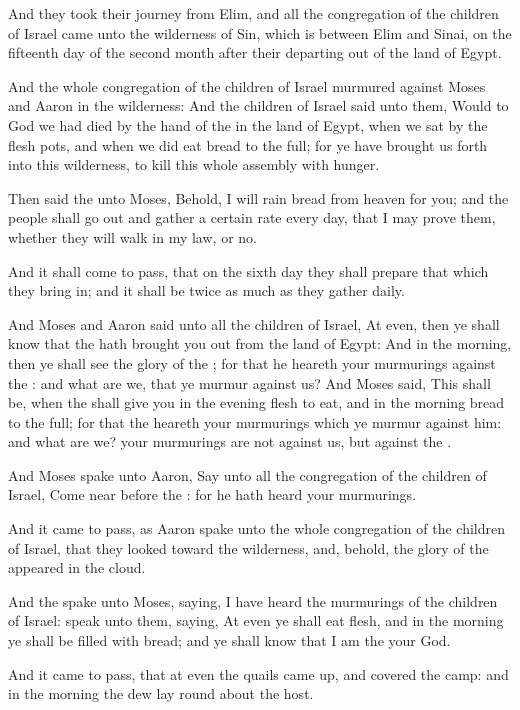 \verse And they took their journey from Elim, and all the congregation
of the children of Israel came unto the wilderness of Sin, which is
between Elim and Sinai, on the fifteenth day of the second month after
their departing out of the land of Egypt.

\verse And the whole congregation of the children of Israel murmured
against Moses and Aaron in the wilderness: \verse And the children of
Israel said unto them, Would to God we had died by the hand of the
\LORD in the land of Egypt, when we sat by the flesh pots, and when we
did eat bread to the full; for ye have brought us forth into this
wilderness, to kill this whole assembly with hunger.

\verse Then said the \LORD unto Moses, Behold, I will rain bread from
heaven for you; and the people shall go out and gather a certain rate
every day, that I may prove them, whether they will walk in my law, or
no.

\verse And it shall come to pass, that on the sixth day they shall
prepare that which they bring in; and it shall be twice as much as
they gather daily.

\verse And Moses and Aaron said unto all the children of Israel, At
even, then ye shall know that the \LORD hath brought you out from the
land of Egypt: \verse And in the morning, then ye shall see the glory of
the \LORD; for that he heareth your murmurings against the \LORD: and
what are we, that ye murmur against us?  \verse And Moses said, This
shall be, when the \LORD shall give you in the evening flesh to eat,
and in the morning bread to the full; for that the \LORD heareth your
murmurings which ye murmur against him: and what are we? your
murmurings are not against us, but against the \LORD.

\verse And Moses spake unto Aaron, Say unto all the congregation of the
children of Israel, Come near before the \LORD: for he hath heard your
murmurings.

\verse And it came to pass, as Aaron spake unto the whole congregation
of the children of Israel, that they looked toward the wilderness,
and, behold, the glory of the \LORD appeared in the cloud.

\verse And the \LORD spake unto Moses, saying, \verse I have heard the
murmurings of the children of Israel: speak unto them, saying, At even
ye shall eat flesh, and in the morning ye shall be filled with bread;
and ye shall know that I am the \LORD your God.

\verse And it came to pass, that at even the quails came up, and
covered the camp: and in the morning the dew lay round about the host.

